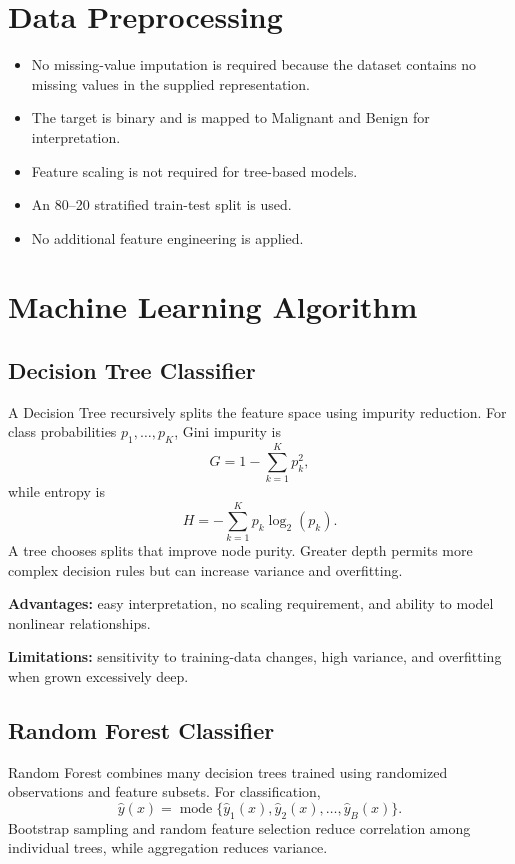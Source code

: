 \documentclass[12pt,a4paper]{article}
\begin{document}
\section{Data Preprocessing}
\begin{itemize}
\item No missing-value imputation is required because the dataset contains no missing values in the supplied representation.
\item The target is binary and is mapped to Malignant and Benign for interpretation.
\item Feature scaling is not required for tree-based models.
\item An 80--20 stratified train-test split is used.
\item No additional feature engineering is applied.
\end{itemize}

\section{Machine Learning Algorithm}

\subsection{Decision Tree Classifier}
A Decision Tree recursively splits the feature space using impurity reduction. For class probabilities $p_1,\ldots,p_K$, Gini impurity is
\[
G=1-\sum_{k=1}^{K}p_k^2,
\]
while entropy is
\[
H=-\sum_{k=1}^{K}p_k\log_2(p_k).
\]
A tree chooses splits that improve node purity. Greater depth permits more complex decision rules but can increase variance and overfitting.

\textbf{Advantages:} easy interpretation, no scaling requirement, and ability to model nonlinear relationships.

\textbf{Limitations:} sensitivity to training-data changes, high variance, and overfitting when grown excessively deep.

\subsection{Random Forest Classifier}
Random Forest combines many decision trees trained using randomized observations and feature subsets. For classification,
\[
\hat y(x)=\operatorname{mode}\{\hat y_1(x),\hat y_2(x),\ldots,\hat y_B(x)\}.
\]
Bootstrap sampling and random feature selection reduce correlation among individual trees, while aggregation reduces variance.
\end{document}

